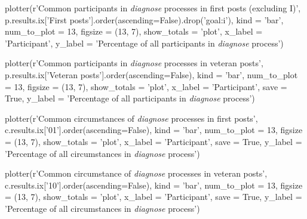 \begin{pyverbatim}
plotter(r'Common participants in \emph{diagnose} processes in first posts (excluding I)', 
    p.results.ix['First posts'].order(ascending=False).drop('goal:i'), kind = 'bar', 
    num_to_plot = 13, figsize = (13, 7), show_totals = 'plot', x_label = 'Participant',
    y_label = 'Percentage of all participants in \emph{diagnose} process')

plotter(r'Common participants in \emph{diagnose} processes in veteran posts', 
    p.results.ix['Veteran posts'].order(ascending=False), kind = 'bar', num_to_plot = 13, 
    figsize = (13, 7), show_totals = 'plot', x_label = 'Participant', save = True, 
    y_label = 'Percentage of all participants in \emph{diagnose} process')

plotter(r'Common circumstances of \emph{diagnose} processes in first posts', 
    c.results.ix['01'].order(ascending=False), kind = 'bar', num_to_plot = 13, 
    figsize = (13, 7), show_totals = 'plot', x_label = 'Participant', save = True, 
    y_label = 'Percentage of all circumstances in \emph{diagnose} process')

plotter(r'Common circumstance of \emph{diagnose} processes in veteran posts', 
    c.results.ix['10'].order(ascending=False), kind = 'bar', num_to_plot = 13, 
    figsize = (13, 7), show_totals = 'plot', x_label = 'Participant', save = True,
    y_label = 'Percentage of all circumstances in \emph{diagnose} process')
\end{pyverbatim}


